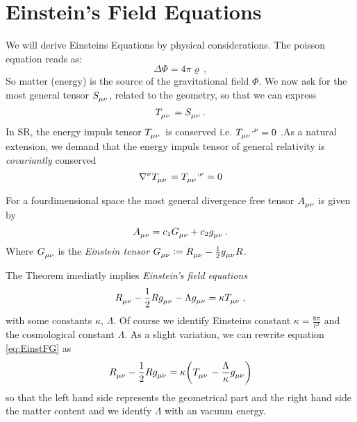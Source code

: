 \chapter{Einstein's Field Equations}
We will derive Einsteins Equations by physical considerations. The poisson
equation reads as:
\begin{equation}
\Delta\Phi=4\pi\varrho\, ,
\end{equation}
So matter (energy) is the source of the gravitational field $\Phi$. 
We now ask for the most general tensor $\tensor{S}{_\mu_\nu}$, related to the
geometry, so that we can express
\begin{equation}
\tensor{T}{_\mu_\nu}=\tensor{S}{_\mu_\nu}
\,.
\end{equation}
In SR, the energy impuls tensor $\tensor{T}{_\mu_\nu}$ is conserved i.e.
$\tensor{T}{_\mu_\nu^{,\nu}}=0$ .As a natural extension, we demand that the
energy impuls tensor of general relativity is \emph{covariantly} conserved
\begin{equation}
\tensor{\nabla}{^\nu}\tensor{T}{_\mu_\nu}=\tensor{T}{_\mu_\nu^{;\nu}}=0
\end{equation}
\begin{theorem}[Lovelock]
For a fourdimensional space the most general divergence free tensor
$\tensor{A}{_\mu_\nu}$ is given by
\begin{equation}
\tensor{A}{_\mu_\nu}= c_1\tensor{G}{_\mu_\nu}+c_2\tensor{g}{_\mu_\nu}\, .
\end{equation}
Where $\tensor{G}{_\mu_\nu}$ is the \emph{Einstein tensor}
$\tensor{G}{_\mu_\nu}:=\tensor{R}{_\mu_\nu}-\frac{1}{2}\tensor{g}{_\mu_\nu}R$.
\end{theorem}
The Theorem imediatly implies \emph{Einstein's field equations}
\begin{equation}
\tensor{R}{_\mu_\nu}-\frac{1}{2}R\tensor{g}{_\mu_\nu}-\Lambda\tensor{g}{_\mu_\nu}
=\kappa\tensor{T}{_\mu_\nu}\, ,\label{eq:EinstFG}
\end{equation}
with some constants $\kappa$, $\Lambda$.
Of course we identify Einsteins constant $\kappa=\frac{8\pi}{c^2}$ and the
cosmological constant $\Lambda$. As a slight variation, we can rewrite equation
\eqref{eq:EinstFG} as
\begin{equation}
\tensor{R}{_\mu_\nu}-\frac{1}{2}R\tensor{g}{_\mu_\nu}
=\kappa\left(\tensor{T}{_\mu_\nu}-\frac{\Lambda}{\kappa}\tensor{g}{_\mu_\nu}\right)
\end{equation}
so that the left hand side represents the geometrical part and the right hand
side the matter content and we identfy $\Lambda$ with an vacuum energy.
